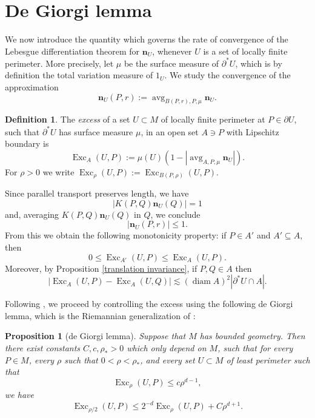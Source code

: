 \documentclass[reqno,11pt]{amsart}
\DeclareMathOperator{\avg}{avg}
\DeclareMathOperator{\diam}{diam}
\DeclareMathOperator{\Exc}{Exc}
\newcommand{\normal}{\mathbf n}
\newcommand{\dfn}[1]{\emph{#1}\index{#1}}
\newtheorem{proposition}[theorem]{Proposition}
\theoremstyle{definition}
\newtheorem{definition}[theorem]{Definition}
\numberwithin{equation}{section}
\begin{document}
\section{De Giorgi lemma}\label{DeGiorgiSec}
We now introduce the quantity which governs the rate of convergence of the Lebesgue differentiation theorem for $\normal_U$, whenever $U$ is a set of locally finite perimeter.
More precisely, let $\mu$ be the surface measure of $\partial^* U$, which is by definition the total variation measure of $1_U$.
We study the convergence of the approximation
$$\normal_U(P, r) := \avg_{B(P, r), P, \mu} \normal_U.$$

\begin{definition}
The \dfn{excess} of a set $U \subset M$ of locally finite perimeter at $P \in \partial U$, such that $\partial^* U$ has surface measure $\mu$, in an open set $A \ni P$ with Lipschitz boundary is
$$\Exc_A(U, P) := \mu(U)\left(1 - \left|\avg_{A, P, \mu} \normal_U\right|\right).$$
For $\rho > 0$ we write $\Exc_\rho(U, P) := \Exc_{B(P, \rho)}(U, P)$.
\end{definition}

Since parallel transport preserves length, we have
$$|K(P, Q) \normal_U(Q)| = 1$$
and, averaging $K(P, Q) \normal_U(Q)$ in $Q$, we conclude
\begin{equation}\label{normal isnt too big}
|\normal_U(P, r)| \leq 1.
\end{equation}
From this we obtain the following monotonicity property: if $P \in A'$ and $A' \subseteq A$, then
\begin{equation}\label{approximate monotone}
0 \leq \Exc_{A'}(U, P) \leq \Exc_A(U, P).
\end{equation}
Moreover, by Proposition \ref{translation invariance}, if $P, Q \in A$ then 
\begin{equation}\label{translation invariant excess}
|\Exc_A(U, P) - \Exc_A(U, Q)| \lesssim (\diam A)^2 |\partial^* U \cap A|.
\end{equation}

Following \cite{Miranda66,Giusti77,deGiorgi61}, we proceed by controlling the excess using the following de Giorgi lemma, which is the Riemannian generalization of \cite[Theorem 8.1]{Giusti77}:

\begin{proposition}[de Giorgi lemma]\label{de Giorgi}
Suppose that $M$ has bounded geometry.
Then there exist constants $C, c, \rho_* > 0$ which only depend on $M$, such that for every $P \in M$, every $\rho$ such that $0 < \rho < \rho_*$, and every set $U \subset M$ of least perimeter such that
\begin{equation}\label{base case}
\Exc_\rho(U, P) \leq c\rho^{d - 1},
\end{equation}
we have
\begin{equation}\label{dGL concl}
\Exc_{\rho/2}(U, P) \leq 2^{-d} \Exc_\rho(U, P) + C\rho^{d + 1}.
\end{equation}
\end{proposition}
\end{document}
